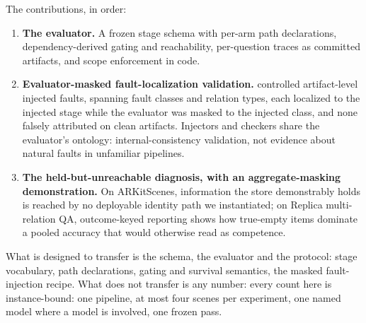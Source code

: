 The contributions, in order:
\begin{enumerate}\itemsep2pt \parskip0pt
  \item \textbf{The evaluator.} A frozen stage schema with per-arm path declarations,
  dependency-derived gating and reachability, per-question traces as committed
  artifacts, and scope enforcement in code.
  \item \textbf{Evaluator-masked fault-localization validation.}
  \SRFaultLocalized{} controlled artifact-level injected faults, spanning
  \SRFaultClasses{} fault classes and \SRFaultRelationTypes{} relation types, each
  localized to the injected stage while the evaluator was masked to the injected class,
  and none falsely attributed on clean artifacts. Injectors and checkers share the
  evaluator's ontology: internal-consistency validation, not evidence about natural
  faults in unfamiliar pipelines.
  \item \textbf{The held-but-unreachable diagnosis, with an aggregate-masking
  demonstration.} On ARKitScenes, information the store demonstrably holds is reached by
  no deployable identity path we instantiated; on Replica multi-relation QA, outcome-keyed
  reporting shows how true-empty items dominate a pooled accuracy that would otherwise
  read as competence.
\end{enumerate}

What is designed to transfer is the schema, the evaluator and the protocol:
stage vocabulary, path declarations, gating and survival semantics, the masked
fault-injection recipe. What does not transfer is any number: every count here is
instance-bound: one pipeline, at most four scenes per experiment, one named model where
a model is involved, one frozen pass.
